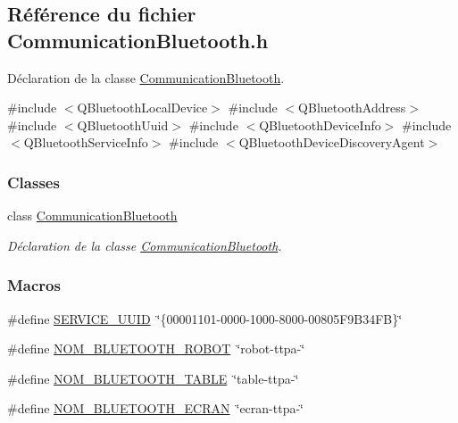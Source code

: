 \hypertarget{terminal-_t_t_p_a_2communicationbluetooth_8h}{}\subsection{Référence du fichier Communication\+Bluetooth.\+h}
\label{terminal-_t_t_p_a_2communicationbluetooth_8h}


Déclaration de la classe \hyperlink{class_communication_bluetooth}{Communication\+Bluetooth}.  


{\ttfamily \#include $<$Q\+Bluetooth\+Local\+Device$>$}\newline
{\ttfamily \#include $<$Q\+Bluetooth\+Address$>$}\newline
{\ttfamily \#include $<$Q\+Bluetooth\+Uuid$>$}\newline
{\ttfamily \#include $<$Q\+Bluetooth\+Device\+Info$>$}\newline
{\ttfamily \#include $<$Q\+Bluetooth\+Service\+Info$>$}\newline
{\ttfamily \#include $<$Q\+Bluetooth\+Device\+Discovery\+Agent$>$}\newline
\subsubsection*{Classes}
\begin{DoxyCompactItemize}
\item 
class \hyperlink{class_communication_bluetooth}{Communication\+Bluetooth}
\begin{DoxyCompactList}\small\item\em Déclaration de la classe \hyperlink{class_communication_bluetooth}{Communication\+Bluetooth}. \end{DoxyCompactList}\end{DoxyCompactItemize}
\subsubsection*{Macros}
\begin{DoxyCompactItemize}
\item 
\#define \hyperlink{terminal-_t_t_p_a_2communicationbluetooth_8h_a445125ee8c34695376c85f10b38844d6}{S\+E\+R\+V\+I\+C\+E\+\_\+\+U\+U\+ID}~\char`\"{}\{00001101-\/0000-\/1000-\/8000-\/00805\+F9\+B34\+F\+B\}\char`\"{}
\item 
\#define \hyperlink{terminal-_t_t_p_a_2communicationbluetooth_8h_a47332bb9b30ed8b0f38fa7b5bd11fd47}{N\+O\+M\+\_\+\+B\+L\+U\+E\+T\+O\+O\+T\+H\+\_\+\+R\+O\+B\+OT}~\char`\"{}robot-\/ttpa-\/\char`\"{}
\item 
\#define \hyperlink{terminal-_t_t_p_a_2communicationbluetooth_8h_aa416b2be7573de0d7832248a27ba09a8}{N\+O\+M\+\_\+\+B\+L\+U\+E\+T\+O\+O\+T\+H\+\_\+\+T\+A\+B\+LE}~\char`\"{}table-\/ttpa-\/\char`\"{}
\item 
\#define \hyperlink{terminal-_t_t_p_a_2communicationbluetooth_8h_a2bd8beaaf0c4b59979a3f78d4c134ec8}{N\+O\+M\+\_\+\+B\+L\+U\+E\+T\+O\+O\+T\+H\+\_\+\+E\+C\+R\+AN}~\char`\"{}ecran-\/ttpa-\/\char`\"{}
\end{DoxyCompactItemize}


